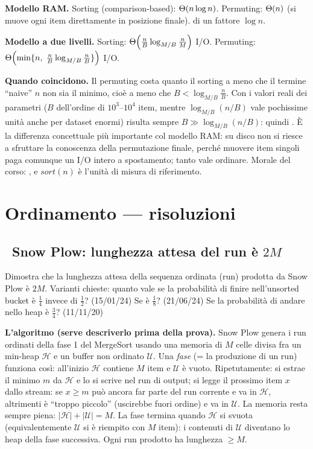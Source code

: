\textbf{Modello RAM.} Sorting (comparison-based): $\Theta\!\left(n\log n\right)$. Permuting: $\Theta\!\left(n\right)$ (si muove
ogni item direttamente in posizione finale). 
di un fattore $\log n$.

\textbf{Modello a due livelli.} Sorting: $\Theta\!\left(\frac{n}{B}\log_{M/B}\frac{n}{M}\right)$ I/O.
Permuting: $\Theta\!\left(\min\{n,\;\frac{n}{B}\log_{M/B}\frac{n}{B}\}\right)$ I/O.

\textbf{Quando coincidono.} Il permuting costa quanto il sorting a meno che il termine ``naive''
$n$ non sia il minimo, cio\`e a meno che $B<\log_{M/B}\frac{n}{B}$. Con i valori reali dei
parametri ($B$ dell'ordine di $10^3$--$10^4$ item, mentre $\log_{M/B}(n/B)$ vale pochissime unit\`a
anche per dataset enormi) risulta sempre $B\gg\log_{M/B}(n/B)$: quindi . \`E la differenza concettuale pi\`u
importante col modello RAM: su disco non si riesce a sfruttare la conoscenza della permutazione
finale, perch\'e muovere item singoli paga comunque un I/O intero a spostamento; tanto vale
ordinare. Morale del corso: , e $sort(n)$ \`e l'unit\`a di misura di riferimento.

\section{Ordinamento --- risoluzioni}

\subsection*{\hot\ Snow Plow: lunghezza attesa del run \`e $2M$}

\begin{domanda}
Dimostra che la lunghezza attesa della sequenza ordinata (run) prodotta da Snow Plow \`e $2M$.
Varianti chieste: quanto vale se la probabilit\`a di finire nell'unsorted bucket \`e $\tfrac14$
invece di $\tfrac12$? (15/01/24) Se \`e $\tfrac18$? (21/06/24) Se la probabilit\`a di andare nello
heap \`e $\tfrac34$? (11/11/20)
\end{domanda}

\textbf{L'algoritmo (serve descriverlo prima della prova).} Snow Plow genera i run ordinati della
fase 1 del MergeSort usando una memoria di $M$ celle divisa fra un min-heap $\mathcal{H}$ e un
buffer non ordinato $\mathcal{U}$. Una \emph{fase} (= la produzione di un run) funziona cos\`i:
all'inizio $\mathcal{H}$ contiene $M$ item e $\mathcal{U}$ \`e vuoto. Ripetutamente: si estrae il
minimo $m$ da $\mathcal{H}$ e lo si scrive nel run di output; si legge il prossimo item $x$ dallo
stream: se $x\ge m$ pu\`o ancora far parte del run corrente e va in $\mathcal{H}$, altrimenti \`e
``troppo piccolo'' (uscirebbe fuori ordine) e va in $\mathcal{U}$. La memoria resta sempre piena:
$|\mathcal{H}|+|\mathcal{U}|=M$. La fase termina quando $\mathcal{H}$ si svuota (equivalentemente
$\mathcal{U}$ si \`e riempito con $M$ item): i contenuti di $\mathcal{U}$ diventano lo heap della
fase successiva. Ogni run prodotto ha lunghezza $\ge M$.


